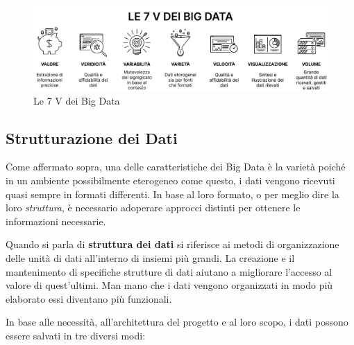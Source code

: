 \begin{figure}[H]
    \centering
    \includegraphics[width=1\linewidth]{figure/capitolo_2/Le 7 V dei Big Data.pdf}
    \caption{Le 7 V dei Big Data}
    \label{fig:Le 7 V dei Big Data}
\end{figure}

\subsection{Strutturazione dei Dati}

Come affermato sopra, una delle caratteristiche dei Big Data è la varietà poiché in un ambiente possibilmente eterogeneo come questo, i dati vengono ricevuti quasi sempre in formati differenti. In base al loro formato, o per meglio dire la loro \textit{struttura}, è necessario adoperare approcci distinti per ottenere le informazioni necessarie.

Quando si parla di \textbf{struttura dei dati} si riferisce ai metodi di organizzazione delle unità di dati all'interno di insiemi più grandi. La creazione e il mantenimento di specifiche strutture di dati aiutano a migliorare l'accesso al valore di quest'ultimi. Man mano che i dati vengono organizzati in modo più elaborato essi diventano più funzionali.

In base alle necessità, all'architettura del progetto e al loro scopo, i dati possono essere salvati in tre diversi modi:

